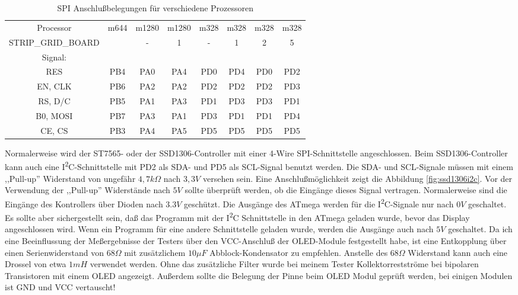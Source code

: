 \begin{table}[H]
  \begin{center}
    \begin{tabular}{| c || c | c | c | c | c | c | c |}
    \hline
 Processor  & m644  & m1280 & m1280  & m328 & m328 & m328 & m328 \\
STRIP\_GRID\_BOARD &       &   -   &   1    &  -   &  1   &  2   &  5   \\
    \hline
    \hline
Signal:     &       &       &        &      &      &      &      \\
  RES       &  PB4  & PA0   &  PA4   & PD0  & PD4  & PD0  & PD2 \\
    \hline
  EN, CLK   &  PB6  & PA2   &  PA2   & PD2  & PD2  & PD2  & PD3 \\
    \hline
  RS, D/C   &  PB5  & PA1   &  PA3   & PD1  & PD3  & PD3  & PD1 \\
    \hline
  B0, MOSI  &  PB7  & PA3   &  PA1   & PD3  & PD1  & PD1  & PD4 \\
    \hline
  CE, CS    &  PB3  & PA4   &  PA5   & PD5  & PD5  & PD5  & PD5 \\
    \hline
    \end{tabular}
  \end{center}
  \caption{SPI Anschlußbelegungen für verschiedene Prozessoren}
  \label{tab:spi-processor}
\end{table}

Normalerweise wird der ST7565- oder der SSD1306-Controller mit einer 4-Wire SPI-Schnittstelle angeschlossen.
Beim SSD1306-Controller kann auch eine I\textsuperscript{2}C-Schnittstelle mit PD2 als SDA- und PD5 als SCL-Signal benutzt werden.
Die SDA- und SCL-Signale müssen mit einem ,,Pull-up'' Widerstand von ungefähr \(4,7k\Omega\) nach \(3,3V\) versehen sein.
Eine Anschlußmöglichkeit zeigt die Abbildung \ref{fig:ssd1306i2c}.
Vor der Verwendung der ,,Pull-up'' Widerstände nach \(5V\) sollte überprüft werden, ob die Eingänge dieses Signal vertragen.
Normalerweise sind die Eingänge des Kontrollers über Dioden nach \(3.3V\) geschützt.
Die Ausgänge des ATmega werden für die I\textsuperscript{2}C-Signale nur nach \(0V\) geschaltet.
Es sollte aber sichergestellt sein, daß das Programm mit der I\textsuperscript{2}C Schnittstelle in den ATmega geladen wurde,
bevor das Display angeschlossen wird. Wenn ein Programm für eine andere Schnittstelle geladen wurde,
werden die Ausgänge auch nach \(5V\) geschaltet.
Da ich eine Beeinflussung der Meßergebnisse der Testers über den VCC-Anschluß der OLED-Module festgestellt habe, 
ist eine Entkopplung über einen Serienwiderstand von \(68\Omega\) mit zusätzlichem \(10\mu F\)
 Abblock-Kondensator zu empfehlen. 
Anstelle des \(68\Omega\) Widerstand kann auch eine Drossel von etwa \(1mH\) verwendet werden.
Ohne das zusätzliche Filter wurde bei meinem Tester Kollektorrestströme bei bipolaren Transistoren mit einem OLED angezeigt.
Außerdem sollte die Belegung der Pinne beim OLED Modul geprüft werden, bei einigen Modulen ist GND und VCC vertauscht!
 
